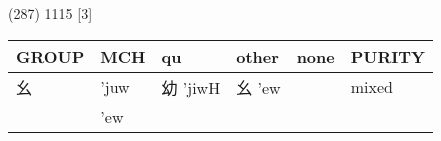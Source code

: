\documentclass[14pt,a4paper]{scrartcl}
\begin{document}
(287) 1115 {[}3{]}

\begin{longtable}[c]{@{}llllll@{}}
\toprule
\begin{minipage}[b]{0.14\columnwidth}\raggedright\strut
GROUP
\strut\end{minipage} &
\begin{minipage}[b]{0.14\columnwidth}\raggedright\strut
MCH
\strut\end{minipage} &
\begin{minipage}[b]{0.14\columnwidth}\raggedright\strut
qu
\strut\end{minipage} &
\begin{minipage}[b]{0.14\columnwidth}\raggedright\strut
other
\strut\end{minipage} &
\begin{minipage}[b]{0.14\columnwidth}\raggedright\strut
none
\strut\end{minipage} &
\begin{minipage}[b]{0.14\columnwidth}\raggedright\strut
PURITY
\strut\end{minipage}\tabularnewline
\midrule
\endhead
\begin{minipage}[t]{0.14\columnwidth}\raggedright\strut
幺
\strut\end{minipage} &
\begin{minipage}[t]{0.14\columnwidth}\raggedright\strut
'juw
\strut\end{minipage} &
\begin{minipage}[t]{0.14\columnwidth}\raggedright\strut
幼 'jiwH
\strut\end{minipage} &
\begin{minipage}[t]{0.14\columnwidth}\raggedright\strut
幺 'ew
\strut\end{minipage} &
\begin{minipage}[t]{0.14\columnwidth}\raggedright\strut
\strut\end{minipage} &
\begin{minipage}[t]{0.14\columnwidth}\raggedright\strut
mixed
\strut\end{minipage}\tabularnewline
\begin{minipage}[t]{0.14\columnwidth}\raggedright\strut
𢆶
\strut\end{minipage} &
\begin{minipage}[t]{0.14\columnwidth}\raggedright\strut
'ew
\strut\end{minipage} &
\begin{minipage}[t]{0.14\columnwidth}\raggedright\strut
\strut\end{minipage} &

\end{longtable}
\end{document}
